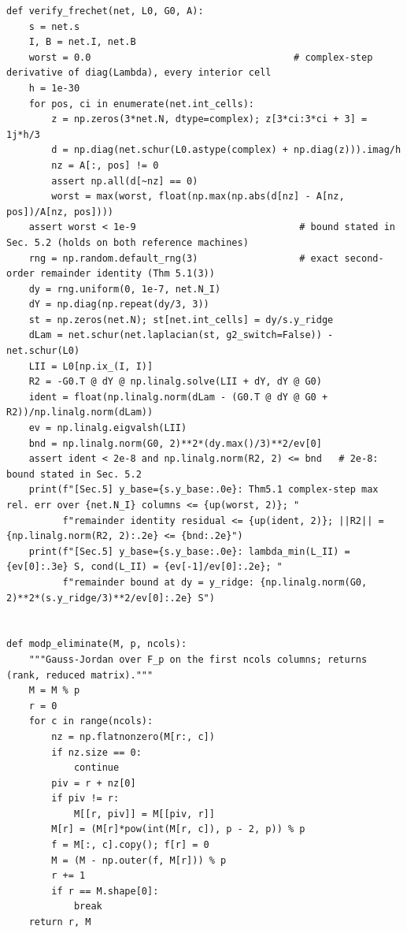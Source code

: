 \documentclass[11pt,a4paper]{article}
\theoremstyle{definition}
\theoremstyle{remark}
\begin{document}
\begin{lstlisting}
def verify_frechet(net, L0, G0, A):
    s = net.s
    I, B = net.I, net.B
    worst = 0.0                                    # complex-step derivative of diag(Lambda), every interior cell
    h = 1e-30
    for pos, ci in enumerate(net.int_cells):
        z = np.zeros(3*net.N, dtype=complex); z[3*ci:3*ci + 3] = 1j*h/3
        d = np.diag(net.schur(L0.astype(complex) + np.diag(z))).imag/h
        nz = A[:, pos] != 0
        assert np.all(d[~nz] == 0)
        worst = max(worst, float(np.max(np.abs(d[nz] - A[nz, pos])/A[nz, pos])))
    assert worst < 1e-9                             # bound stated in Sec. 5.2 (holds on both reference machines)
    rng = np.random.default_rng(3)                  # exact second-order remainder identity (Thm 5.1(3))
    dy = rng.uniform(0, 1e-7, net.N_I)
    dY = np.diag(np.repeat(dy/3, 3))
    st = np.zeros(net.N); st[net.int_cells] = dy/s.y_ridge
    dLam = net.schur(net.laplacian(st, g2_switch=False)) - net.schur(L0)
    LII = L0[np.ix_(I, I)]
    R2 = -G0.T @ dY @ np.linalg.solve(LII + dY, dY @ G0)
    ident = float(np.linalg.norm(dLam - (G0.T @ dY @ G0 + R2))/np.linalg.norm(dLam))
    ev = np.linalg.eigvalsh(LII)
    bnd = np.linalg.norm(G0, 2)**2*(dy.max()/3)**2/ev[0]
    assert ident < 2e-8 and np.linalg.norm(R2, 2) <= bnd   # 2e-8: bound stated in Sec. 5.2
    print(f"[Sec.5] y_base={s.y_base:.0e}: Thm5.1 complex-step max rel. err over {net.N_I} columns <= {up(worst, 2)}; "
          f"remainder identity residual <= {up(ident, 2)}; ||R2|| = {np.linalg.norm(R2, 2):.2e} <= {bnd:.2e}")
    print(f"[Sec.5] y_base={s.y_base:.0e}: lambda_min(L_II) = {ev[0]:.3e} S, cond(L_II) = {ev[-1]/ev[0]:.2e}; "
          f"remainder bound at dy = y_ridge: {np.linalg.norm(G0, 2)**2*(s.y_ridge/3)**2/ev[0]:.2e} S")


def modp_eliminate(M, p, ncols):
    """Gauss-Jordan over F_p on the first ncols columns; returns (rank, reduced matrix)."""
    M = M % p
    r = 0
    for c in range(ncols):
        nz = np.flatnonzero(M[r:, c])
        if nz.size == 0:
            continue
        piv = r + nz[0]
        if piv != r:
            M[[r, piv]] = M[[piv, r]]
        M[r] = (M[r]*pow(int(M[r, c]), p - 2, p)) % p
        f = M[:, c].copy(); f[r] = 0
        M = (M - np.outer(f, M[r])) % p
        r += 1
        if r == M.shape[0]:
            break
    return r, M



\end{lstlisting}
\end{document}
